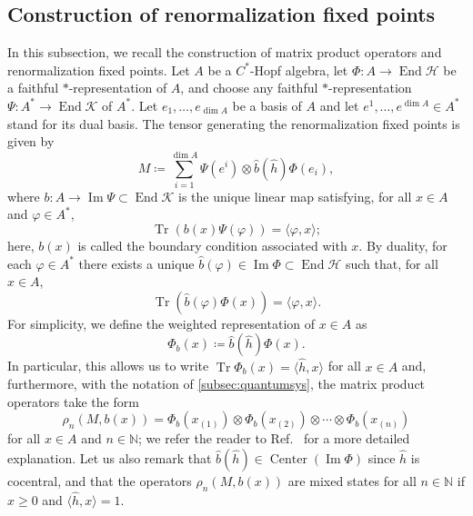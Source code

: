 \documentclass[a4paper,10pt]{amsart}
\newcommand{\eval}[2]{\langle #1 , #2\rangle}
\theoremstyle{definition}
\begin{document}
\subsection{Construction of renormalization fixed points}
\label{subsec:rfps}
In this subsection, we recall the construction of matrix product operators and renormalization fixed points.
Let $A$ be a $C^*$-Hopf algebra, let $\Phi:A\to\operatorname{End}\mathscr{H}$ be a faithful $*$-representation of $A$, and choose any faithful $*$-representation $\Psi:A^*\to\operatorname{End}\mathscr{K}$ of $A^*$. Let $e_1,\ldots,e_{\dim A}$ be a basis of $A$ and let $e^{1},\ldots, e^{\dim A}\in A^*$ stand for its dual basis.
The tensor generating the renormalization fixed points is given by
\begin{equation}
\label{eq:DefTensorRFP}
    M \coloneqq  \sum_{i=1}^{\dim A}  \Psi(e^i) \otimes \hat{b}(\hat{h}) \Phi(e_i),
\end{equation}
where $b:A \to \operatorname{Im}\Psi \subset \operatorname{End}\mathscr{K}$ is the unique linear map satisfying, for all $x\in A$ and $\varphi\in A^*$,
\begin{equation}\label{eq:DefBdry}
	\operatorname{Tr}(b(x) \Psi(\varphi)) = \eval{\varphi}{x};
\end{equation}
here, $b(x)$ is called the boundary condition associated with $x$.
By duality, for each $\varphi \in A^*$ there exists a unique $\hat{b}(\varphi)\in \operatorname{Im}\Phi \subset \operatorname{End}\mathscr{H}$ such that, for all $x\in A$,
\begin{equation}\label{eq:DefBdry-Dual}
	\operatorname{Tr}(\hat{b}(\varphi) \Phi(x)) = \eval{\varphi}{x}.
\end{equation}
For simplicity, we define the weighted representation of $x\in A$ as
\begin{equation}
	\Phi_b(x) \coloneqq \hat{b}(\hat{h}) \Phi(x).
\end{equation}
In particular, this allows us to write $\operatorname{Tr}\Phi_b(x)=\eval{\hat{h}}{x}$ for all $x\in A$ and, furthermore, with the notation of \cref{subsec:quantumsys},
the matrix product operators take the form
\begin{equation}
    \rho_{n}(M,b(x)) = \Phi_b(x_{(1)}) \otimes \Phi_b(x_{(2)}) \otimes\cdots\otimes \Phi_b(x_{(n)})
\end{equation}
for all $x\in A$ and $n\in\mathbb{N}$; we refer the reader to Ref.~\cite{molnar_matrix_2022} for a more detailed explanation. Let us also remark that $\hat{b}(\hat{h})\in\operatorname{Center}(\operatorname{Im}\Phi)$ since $\hat{h}$ is cocentral, and that the operators $\rho_n(M,b(x))$ are mixed states for all $n\in\mathbb{N}$ if $x\geq 0$ and $\eval{\hat{h}}{x} = 1$.
\end{document}
